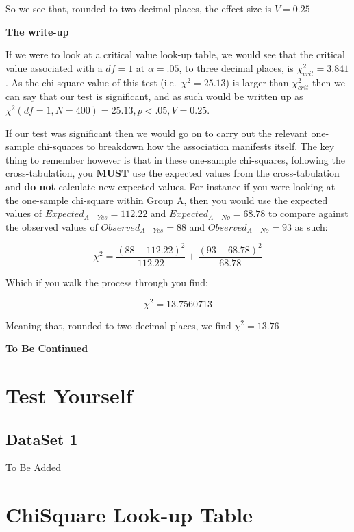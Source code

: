 \documentclass[
  oneside]{book}
\begin{document}
So we see that, rounded to two decimal places, the effect size is \(V = 0.25\)

\textbf{The write-up}

If we were to look at a critical value look-up table, we would see that the critical value associated with a \(df = 1\) at \(\alpha = .05\), to three decimal places, is \(\chi^2_{crit} = 3.841\). As the chi-square value of this test (i.e.~\(\chi^2 = 25.13\)) is larger than \(\chi^2_{crit}\) then we can say that our test is significant, and as such would be written up as \(\chi^2(df = 1, N = 400) = 25.13,p < .05, V = 0.25\).

If our test was significant then we would go on to carry out the relevant one-sample chi-squares to breakdown how the association manifests itself. The key thing to remember however is that in these one-sample chi-squares, following the cross-tabulation, you \textbf{MUST} use the expected values from the cross-tabulation and \textbf{do not} calculate new expected values. For instance if you were looking at the one-sample chi-square within Group A, then you would use the expected values of \(Expected_{A-Yes} = 112.22\) and \(Expected_{A-No} = 68.78\) to compare against the observed values of \(Observed_{A-Yes} = 88\) and \(Observed_{A-No} = 93\) as such:

\[\chi^2 = \frac{(88 - 112.22)^2}{112.22}+ \frac{(93 - 68.78)^2}{68.78}\]

Which if you walk the process through you find:

\[\chi^2 = 13.7560713\]

Meaning that, rounded to two decimal places, we find \(\chi^2 = 13.76\)

\textbf{To Be Continued}

\hypertarget{test-yourself-1}{%
\section{Test Yourself}\label{test-yourself-1}}

\hypertarget{dataset-1-1}{%
\subsection{DataSet 1}\label{dataset-1-1}}

To Be Added

\hypertarget{chisquare-look-up-table-1}{%
\section{ChiSquare Look-up Table}\label{chisquare-look-up-table-1}}
\end{document}
